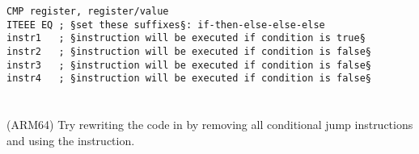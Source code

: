 \begin{lstlisting}[caption=ARM (\ThumbMode)]
CMP register, register/value
ITEEE EQ ; §set these suffixes§: if-then-else-else-else
instr1   ; §instruction will be executed if condition is true§
instr2   ; §instruction will be executed if condition is false§
instr3   ; §instruction will be executed if condition is false§
instr4   ; §instruction will be executed if condition is false§
\end{lstlisting}

\section{\Exercise}

(ARM64) Try rewriting the code in  by removing all 
conditional jump instructions and using the  instruction.

